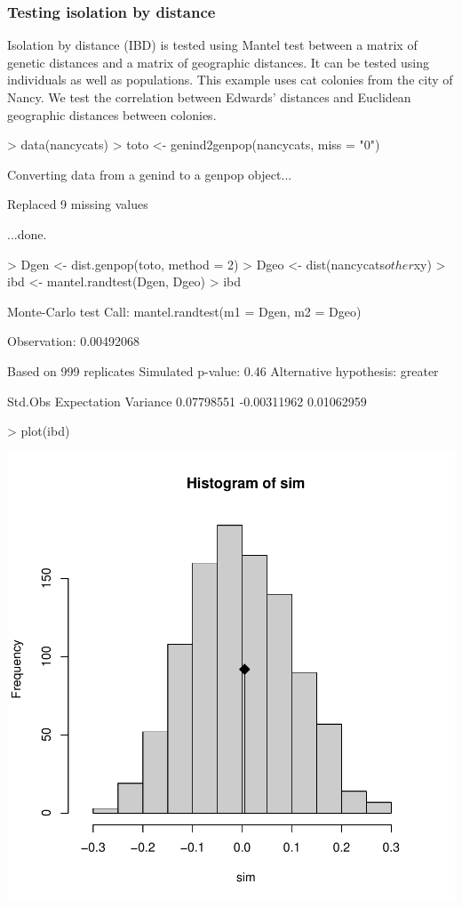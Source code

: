 \documentclass{article}
\begin{document}
\subsubsection{Testing isolation by distance}
Isolation by distance (IBD) is tested using Mantel test between a matrix of genetic distances and a matrix of geographic distances.
It can be tested using individuals as well as populations.
This example uses cat colonies from the city of Nancy.
We test the correlation between Edwards' distances and Euclidean geographic distances between colonies.
\begin{Schunk}
\begin{Sinput}
> data(nancycats)
> toto <- genind2genpop(nancycats, miss = "0")
\end{Sinput}
\begin{Soutput}
 Converting data from a genind to a genpop object... 

 Replaced 9 missing values 

...done.
\end{Soutput}
\begin{Sinput}
> Dgen <- dist.genpop(toto, method = 2)
> Dgeo <- dist(nancycats$other$xy)
> ibd <- mantel.randtest(Dgen, Dgeo)
> ibd
\end{Sinput}
\begin{Soutput}
Monte-Carlo test
Call: mantel.randtest(m1 = Dgen, m2 = Dgeo)

Observation: 0.00492068 

Based on 999 replicates
Simulated p-value: 0.46 
Alternative hypothesis: greater 

    Std.Obs Expectation    Variance 
 0.07798551 -0.00311962  0.01062959 
\end{Soutput}
\end{Schunk}
\begin{Schunk}
\begin{Sinput}
> plot(ibd)
\end{Sinput}
\end{Schunk}
\includegraphics{figs/base-085}
\end{document}

